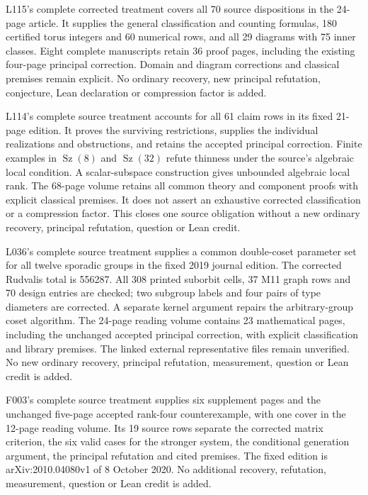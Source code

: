 \documentclass[11pt,a4paper]{article}
\begin{document}
L115's complete corrected treatment covers all 70 source dispositions in the
24-page article. It supplies the general classification and counting formulas,
180 certified torus integers and 60 numerical rows, and all 29 diagrams with
75 inner classes. Eight complete manuscripts retain 36 proof pages, including
the existing four-page principal correction. Domain and diagram corrections
and classical premises remain explicit. No ordinary recovery, new principal
refutation, conjecture, Lean declaration or compression factor is added.

L114's complete source treatment accounts for all 61 claim rows in its fixed
21-page edition. It proves the surviving restrictions, supplies the individual
realizations and obstructions, and retains the accepted principal correction.
Finite examples in $\operatorname{Sz}(8)$ and $\operatorname{Sz}(32)$ refute
thinness under the source's algebraic local condition. A scalar-subspace
construction gives unbounded algebraic local rank. The 68-page volume retains
all common theory and component proofs with explicit classical premises.
It does not assert an exhaustive corrected classification or a compression
factor. This closes one source obligation without a new ordinary recovery,
principal refutation, question or Lean credit.

L036's complete source treatment supplies a common double-coset parameter
set for all twelve sporadic groups in the fixed 2019 journal edition.
The corrected Rudvalis total is 556287. All 308 printed suborbit cells,
37 M11 graph rows and 70 design entries are checked; two subgroup labels
and four pairs of type diameters are corrected. A separate kernel
argument repairs the arbitrary-group coset algorithm. The 24-page
reading volume contains 23 mathematical pages, including the unchanged
accepted principal correction, with explicit classification and library
premises. The linked external representative files remain unverified.
No new ordinary recovery, principal refutation, measurement, question
or Lean credit is added.

F003's complete source treatment supplies six supplement pages and the
unchanged five-page accepted rank-four counterexample, with one cover in
the 12-page reading volume. Its 19 source rows separate the corrected
matrix criterion, the six valid cases for the stronger system, the
conditional generation argument, the principal refutation and cited
premises. The fixed edition is arXiv:2010.04080v1 of 8 October 2020.
No additional recovery, refutation, measurement, question or Lean credit
is added.
\end{document}
